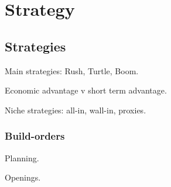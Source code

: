 \chapter{Strategy}

\section{Strategies}

Main strategies: Rush, Turtle, Boom.

Economic advantage v short term advantage.

Niche strategies: all-in, wall-in, proxies.

\subsection{Build-orders}

Planning.

Openings.